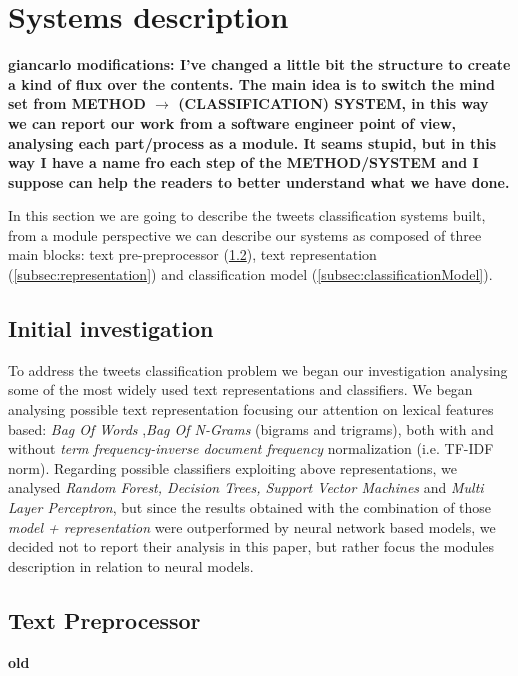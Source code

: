 \section{Systems description} \label{sec:methods}

\textbf{giancarlo modifications: I've changed a little bit the structure to create a kind of flux over the contents. The main idea is to switch the mind set from METHOD $\rightarrow$ (CLASSIFICATION) SYSTEM, in this way we can report our work from a software engineer point of view, analysing each part/process as a module. It seams stupid, but in this way I have a name fro each step of the METHOD/SYSTEM and I suppose can help the readers to better understand what we have done.}


In this section we are going to describe the tweets classification systems built, from a module perspective we can describe our systems as composed of three main blocks: text pre-preprocessor (\cref{subsec:preprocessing}),  text representation (\cref{subsec:representation}) and classification model (\cref{subsec:classificationModel}). 


\subsection{Initial investigation} \label{subsec:boh}
To address the tweets classification problem we began our investigation analysing some of the most widely used text representations and classifiers.
We began analysing possible text representation focusing our attention on lexical features based: \emph{Bag Of Words} \cite{harris1954distributional},\emph{Bag Of N-Grams} (bigrams and trigrams), both with and without \emph{term frequency-inverse document frequency} normalization (i.e. TF-IDF norm).
Regarding possible classifiers exploiting above representations,  we analysed \emph{Random Forest, Decision Trees, Support Vector Machines} and \emph{Multi Layer Perceptron}, but since the results obtained with the combination of those \emph{model + representation} were outperformed by neural network based models, we decided not to report their analysis in this paper, but rather focus the modules description in relation to neural models.


\subsection{Text Preprocessor} \label{subsec:preprocessing}

\textbf{old}

